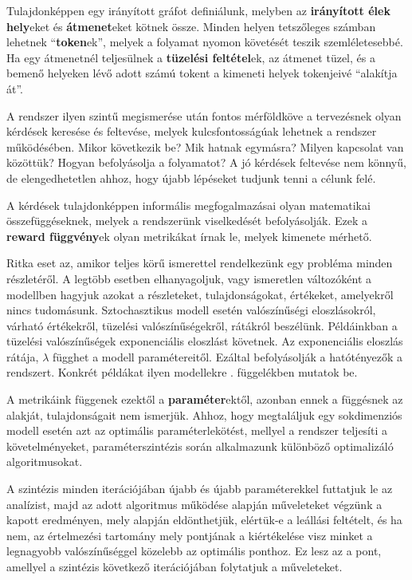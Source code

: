 Tulajdonképpen egy irányított gráfot definiálunk, melyben az \textbf{irányított élek} \textbf{hely}eket és \textbf{átmenet}eket kötnek össze. Minden helyen tetszőleges számban lehetnek ``\textbf{token}ek'', melyek a folyamat nyomon követését teszik szemléletesebbé. Ha egy átmenetnél teljesülnek a \textbf{tüzelési feltétel}ek, az átmenet tüzel, és a bemenő helyeken lévő adott számú tokent a kimeneti helyek tokenjeivé ``alakítja át''.

A rendszer ilyen szintű megismerése után fontos mérföldköve a tervezésnek olyan kérdések keresése és feltevése, melyek kulcsfontosságúak lehetnek a rendszer működésében. Mikor következik be? Mik hatnak egymásra? Milyen kapcsolat van közöttük? Hogyan befolyásolja a folyamatot? A jó kérdések feltevése nem könnyű, de elengedhetetlen ahhoz, hogy újabb lépéseket tudjunk tenni a célunk felé.

A kérdések tulajdonképpen informális megfogalmazásai olyan matematikai összefüggéseknek, melyek a rendszerünk viselkedését befolyásolják. Ezek a \textbf{reward függvény}ek olyan metrikákat írnak le, melyek kimenete mérhető. 

Ritka eset az, amikor teljes körű ismerettel rendelkezünk egy probléma minden részletéről. A legtöbb esetben elhanyagoljuk, vagy ismeretlen változóként a modellben hagyjuk azokat a részleteket, tulajdonságokat, értékeket, amelyekről nincs tudomásunk. 
Sztochasztikus modell esetén valószínűségi eloszlásokról, várható értékekről, tüzelési valószínűségekről, rátákról beszélünk. Példáinkban a tüzelési valószínűségek exponenciális eloszlást követnek. Az exponenciális eloszlás rátája, $\lambda$
függhet a modell paramétereitől. Ezáltal befolyásolják a hatótényezők a rendszert. Konkrét példákat ilyen modellekre . függelékben mutatok be.

A metrikáink függenek ezektől a \textbf{paraméter}ektől, azonban ennek a függésnek az alakját, tulajdonságait nem ismerjük. Ahhoz, hogy megtaláljuk egy sokdimenziós modell esetén azt az optimális paraméterlekötést, mellyel a rendszer teljesíti a követelményeket, paraméterszintézis során alkalmazunk különböző optimalizáló algoritmusokat.

A szintézis minden iterációjában újabb és újabb paraméterekkel futtatjuk le az analízist, majd az adott algoritmus működése alapján műveleteket végzünk a kapott eredményen, mely alapján eldönthetjük, elértük-e a leállási feltételt, és ha nem, az értelmezési tartomány mely pontjának a kiértékelése visz minket a legnagyobb valószínűséggel közelebb az optimális ponthoz. Ez lesz az a pont, amellyel a szintézis következő iterációjában folytatjuk a műveleteket.

